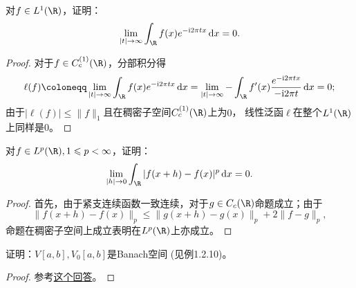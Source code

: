 \begin{14}
    对$f\in L^1(\R)$，证明：
    $$\lim_{|t|\to\infty}\int_\R f(x)e^{-\mathrm{i}2\pi tx}\,{\rm d}x=0.$$
\end{14}
\begin{proof}
    对于$f\in C_c^{(1)}(\R)$，分部积分得
    $$\ell(f)\coloneqq\lim_{|t|\to\infty}\int_\R f(x)e^{-\mathrm{i}2\pi tx}\,{\rm d}x
    =\lim_{|t|\to\infty}-\int_\R f'(x)\frac{e^{-\mathrm{i}2\pi tx}}{-\mathrm{i}2\pi t}\,{\rm d}x=0;$$
    由于$|\ell(f)|\leqslant\|f\|_1$且在稠密子空间$C_c^{(1)}(\R)$上为$0$，
    线性泛函$\ell$在整个$L^1(\R)$上同样是$0$。
\end{proof}

\begin{15}[平均连续性]
    对$f\in L^p(\R),1\leqslant p<\infty$，证明：
    $$\lim_{|h|\to0}\int_\R|f(x+h)-f(x)|^p\,{\rm d}x=0.$$
\end{15}
\begin{proof}
    首先，由于紧支连续函数一致连续，对于$g\in C_c(\R)$命题成立；由于
    $$\|f(x+h)-f(x)\|_p\leqslant\|g(x+h)-g(x)\|_p+2\|f-g\|_p,$$
    命题在稠密子空间上成立表明在$L^p(\R)$上亦成立。
\end{proof}

\begin{17}
    证明：$V[a,b],V_0[a,b]$是Banach空间 (见例1.2.10)。
\end{17}
\begin{proof}
    参考\href{http://math.stackexchange.com/questions/73476/prove-the-normed-space-of-bounded-variation-functions-is-complete?r=SearchResults}{这个回答}。
\end{proof}

